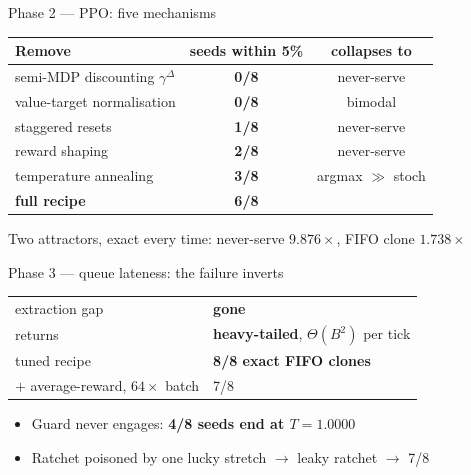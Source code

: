 \documentclass[12pt,aspectratio=169]{beamer}
\newcommand{\good}[1]{\textbf{#1}}
\begin{document}
\begin{frame}{Phase 2 --- PPO: five mechanisms}

\begin{center}
\large
\begin{tabular}{lcc}
\toprule
\textbf{Remove} & \textbf{seeds within 5\%} & \textbf{collapses to} \\
\midrule
semi-MDP discounting $\gamma^{\Delta}$ & \good{0/8} & never-serve \\
value-target normalisation             & \good{0/8} & bimodal \\
staggered resets                       & \good{1/8} & never-serve \\
reward shaping                         & \good{2/8} & never-serve \\
temperature annealing                  & \good{3/8} & argmax $\gg$ stoch \\
\midrule
\textbf{full recipe}                   & \good{6/8} & \\
\bottomrule
\end{tabular}
\end{center}

\vfill
\centering
\small
Two attractors, exact every time: never-serve $9.876\times$, FIFO clone $1.738\times$

\end{frame}

\begin{frame}{Phase 3 --- queue lateness: the failure inverts}

\begin{center}
\large
\begin{tabular}{ll}
\toprule
extraction gap & \good{gone} \\
returns & \good{heavy-tailed}, $\Theta(B^2)$ per tick \\
\midrule
tuned recipe & \good{8/8 exact FIFO clones} \\
$+$ average-reward, $64\times$ batch & 7/8 \\
\bottomrule
\end{tabular}
\end{center}

\vfill
\begin{itemize}
  \item Guard never engages: \good{4/8 seeds end at $T = 1.0000$}
  \item Ratchet poisoned by one lucky stretch $\to$ leaky ratchet $\to$ 7/8
\end{itemize}

\end{frame}
\end{document}
